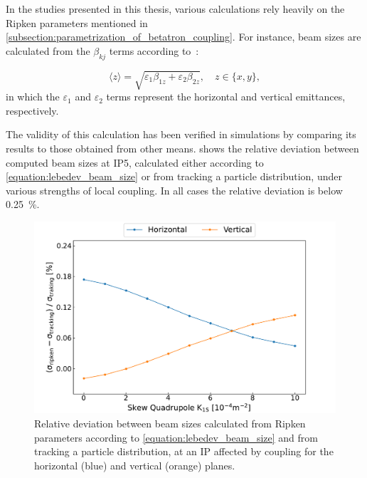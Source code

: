 In the studies presented in this thesis, various calculations rely heavily on the Ripken parameters mentioned in \cref{subsection:parametrization_of_betatron_coupling}.
For instance, beam sizes are calculated from the \(\beta_{kj}\) terms according to~\cite{IOP:Lebedev:Betatron_Motion_Coupling}:

\begin{equation}
    \langle z \rangle = \sqrt{\varepsilon_1 \beta_{1z} + \varepsilon_2 \beta_{2z}}, \quad z \in\{x, y\} ,
    \label{equation:lebedev_beam_size}
\end{equation}
in which the \(\varepsilon_1\) and \(\varepsilon_2\) terms represent the horizontal and vertical emittances, respectively.

The validity of this calculation has been verified in simulations by comparing its results to those obtained from other means.
 shows the relative deviation between computed beam sizes at IP\num{5}, calculated either according to \cref{equation:lebedev_beam_size} or from tracking a particle distribution, under various strengths of local coupling.
In all cases the relative deviation is below \qty{0.25}{\percent}.

\begin{figure}[!htb]
    \centering
    \includegraphics*[width=\textwidth]{Figures/IR_Coupling_Correction/lebedev_vs_tracking.pdf}
    \caption{Relative deviation between beam sizes calculated from Ripken parameters according to \cref{equation:lebedev_beam_size} and from tracking a particle distribution, at an IP affected by coupling for the horizontal (\textcolor{mplblue}{blue}) and vertical (\textcolor{mplorange}{orange}) planes.}
    \label{figure:lebedev_vs_tracking}
\end{figure}

